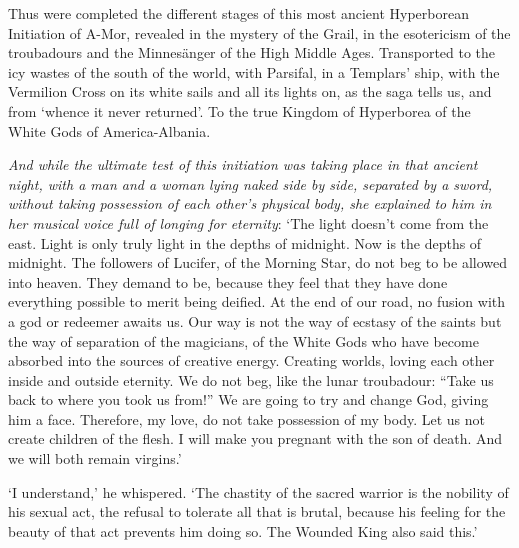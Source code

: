 \begin{quotationx}
Thus were completed the different stages of this most ancient Hyperborean Initiation of A-Mor, revealed in the mystery of the Grail, in the esotericism of the troubadours and the Minnesänger of the High Middle Ages. Transported to the icy wastes of the south of the world, with Parsifal, in a Templars' ship, with the Vermilion Cross on its white sails and all its lights on, as the saga tells us, and from `whence it never returned'. To the true Kingdom of Hyperborea of the White Gods of America-Albania. 

\emph{And while the ultimate test of this initiation was taking place in that ancient night, with a man and a woman lying naked side by side, separated by a sword, without taking possession of each other's physical body, she explained to him in her musical voice full of longing for eternity}: `The light doesn't come from the east. Light is only truly light in the depths of midnight. Now is the depths of midnight. The followers of Lucifer, of the Morning Star, do not beg to be allowed into heaven. They demand to be, because they feel that they have done everything possible to merit being deified. At the end of our road, no fusion with a god or redeemer awaits us. Our way is not the way of ecstasy of the saints but the way of separation of the magicians, of the White Gods who have become absorbed into the sources of creative energy. Creating worlds, loving each other inside and outside eternity. We do not beg, like the lunar troubadour: “Take us back to where you took us from!” We are going to try and change God, giving him a face. Therefore, my love, do not take possession of my body. Let us not create children of the flesh. I will make you pregnant with the son of death. And we will both remain virgins.'

`I understand,' he whispered. `The chastity of the sacred warrior is the nobility of his sexual act, the refusal to tolerate all that is brutal, because his feeling for the beauty of that act prevents him doing so. The Wounded King also said this.'


\end{quotationx}
